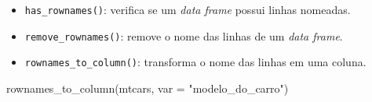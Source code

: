 \documentclass[
]{book}
\newenvironment{Shaded}{\begin{snugshade}}{\end{snugshade}}
\newcommand{\AttributeTok}[1]{\textcolor[rgb]{0.77,0.63,0.00}{#1}}
\newcommand{\FunctionTok}[1]{\textcolor[rgb]{0.00,0.00,0.00}{#1}}
\newcommand{\NormalTok}[1]{#1}
\newcommand{\StringTok}[1]{\textcolor[rgb]{0.31,0.60,0.02}{#1}}
\begin{document}
\begin{itemize}
\item
  \texttt{has\_rownames()}: verifica se um \emph{data frame} possui linhas nomeadas.
\item
  \texttt{remove\_rownames()}: remove o nome das linhas de um \emph{data frame}.
\item
  \texttt{rownames\_to\_column()}: transforma o nome das linhas em uma coluna.
\end{itemize}

\begin{Shaded}
\begin{Highlighting}[]
\FunctionTok{rownames\_to\_column}\NormalTok{(mtcars, }\AttributeTok{var =} \StringTok{"modelo\_do\_carro"}\NormalTok{)}
\end{Highlighting}
\end{Shaded}
\end{document}

